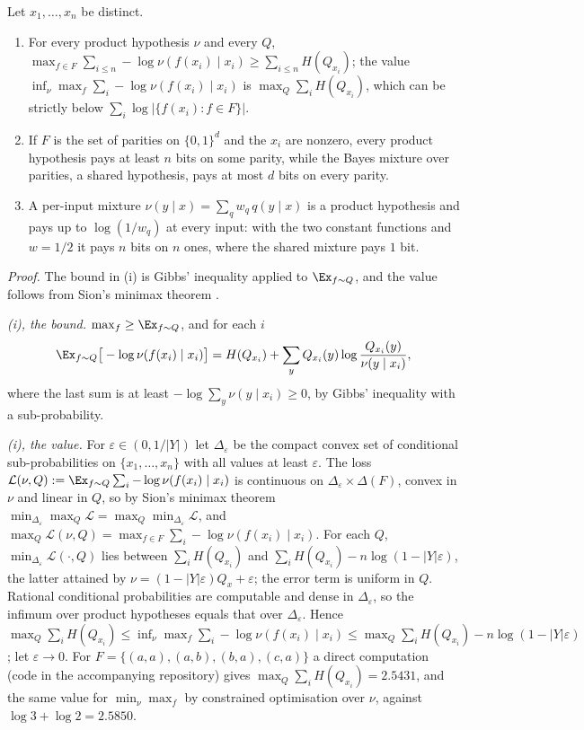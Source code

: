 \begin{proposition}\label{prop:absorb:pricing}
Let $x_1,\dots,x_n$ be distinct.
\begin{enumerate}[label=(\roman*),itemsep=0pt,topsep=2pt]
\item For every product hypothesis $\nu$ and every $Q$, $\max_{f\in F}\sum_{i\le n}-\log\nu(f(x_i)\mid x_i)\ge\sum_{i\le n}H(Q_{x_i})$; the value $\inf_\nu\max_f\sum_i-\log\nu(f(x_i)\mid x_i)$ is $\max_Q\sum_iH(Q_{x_i})$, which can be strictly below $\sum_i\log|\{f(x_i):f\in F\}|$.
\item If $F$ is the set of parities on $\{0,1\}^d$ and the $x_i$ are nonzero, every product hypothesis pays at least $n$ bits on some parity, while the Bayes mixture over parities, a shared hypothesis, pays at most $d$ bits on every parity.
\item A per-input mixture $\nu(y\mid x)=\sum_qw_q\,q(y\mid x)$ is a product hypothesis and pays up to $\log(1/w_q)$ at every input: with the two constant functions and $w=1/2$ it pays $n$ bits on $n$ ones, where the shared mixture pays $1$ bit.
\end{enumerate}
\end{proposition}

\emph{Proof.} The bound in (i) is Gibbs' inequality applied to $\Ex_{f\sim Q}$, and the value follows from Sion's minimax theorem \citep{sion1958general}.

\emph{(i), the bound.} $\max_f\ge\Ex_{f\sim Q}$, and for each $i$
\[
\Ex_{f\sim Q}\big[-\log\nu(f(x_i)\mid x_i)\big]=H(Q_{x_i})+\sum_yQ_{x_i}(y)\log\frac{Q_{x_i}(y)}{\nu(y\mid x_i)},
\]
where the last sum is at least $-\log\sum_y\nu(y\mid x_i)\ge0$, by Gibbs' inequality with a sub-probability.

\emph{(i), the value.} For $\varepsilon\in(0,1/|Y|)$ let $\Delta_\varepsilon$ be the compact convex set of conditional sub-probabilities on $\{x_1,\dots,x_n\}$ with all values at least $\varepsilon$. The loss $\mathcal L(\nu,Q):=\Ex_{f\sim Q}\sum_i-\log\nu(f(x_i)\mid x_i)$ is continuous on $\Delta_\varepsilon\times\Delta(F)$, convex in $\nu$ and linear in $Q$, so by Sion's minimax theorem \citep{sion1958general} $\min_{\Delta_\varepsilon}\max_Q\mathcal L=\max_Q\min_{\Delta_\varepsilon}\mathcal L$, and $\max_Q\mathcal L(\nu,Q)=\max_{f\in F}\sum_i-\log\nu(f(x_i)\mid x_i)$. For each $Q$, $\min_{\Delta_\varepsilon}\mathcal L(\cdot,Q)$ lies between $\sum_iH(Q_{x_i})$ and $\sum_iH(Q_{x_i})-n\log(1-|Y|\varepsilon)$, the latter attained by $\nu=(1-|Y|\varepsilon)Q_x+\varepsilon$; the error term is uniform in $Q$. Rational conditional probabilities are computable and dense in $\Delta_\varepsilon$, so the infimum over product hypotheses equals that over $\Delta_\varepsilon$. Hence $\max_Q\sum_iH(Q_{x_i})\le\inf_\nu\max_f\sum_i-\log\nu(f(x_i)\mid x_i)\le\max_Q\sum_iH(Q_{x_i})-n\log(1-|Y|\varepsilon)$; let $\varepsilon\to0$. For $F=\{(a,a),(a,b),(b,a),(c,a)\}$ a direct computation (code in the accompanying repository) gives $\max_Q\sum_iH(Q_{x_i})=2.5431$, and the same value for $\min_\nu\max_f$ by constrained optimisation over $\nu$, against $\log3+\log2=2.5850$.

